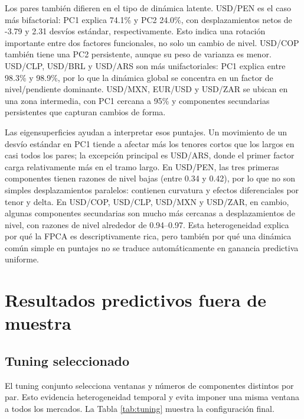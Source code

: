 \documentclass[12pt,a4paper]{article}
\begin{document}
Los pares también difieren en el tipo de dinámica latente. USD/PEN es el caso más bifactorial: PC1 explica 74.1\% y PC2 24.0\%, con desplazamientos netos de -3.79 y 2.31 desvíos estándar, respectivamente. Esto indica una rotación importante entre dos factores funcionales, no solo un cambio de nivel. USD/COP también tiene una PC2 persistente, aunque su peso de varianza es menor. USD/CLP, USD/BRL y USD/ARS son más unifactoriales: PC1 explica entre 98.3\% y 98.9\%, por lo que la dinámica global se concentra en un factor de nivel/pendiente dominante. USD/MXN, EUR/USD y USD/ZAR se ubican en una zona intermedia, con PC1 cercana a 95\% y componentes secundarias persistentes que capturan cambios de forma.

Las eigensuperficies ayudan a interpretar esos puntajes. Un movimiento de un desvío estándar en PC1 tiende a afectar más los tenores cortos que los largos en casi todos los pares; la excepción principal es USD/ARS, donde el primer factor carga relativamente más en el tramo largo. En USD/PEN, las tres primeras componentes tienen razones de nivel bajas (entre 0.34 y 0.42), por lo que no son simples desplazamientos paralelos: contienen curvatura y efectos diferenciales por tenor y delta. En USD/COP, USD/CLP, USD/MXN y USD/ZAR, en cambio, algunas componentes secundarias son mucho más cercanas a desplazamientos de nivel, con razones de nivel alrededor de 0.94--0.97. Esta heterogeneidad explica por qué la FPCA es descriptivamente rica, pero también por qué una dinámica común simple en puntajes no se traduce automáticamente en ganancia predictiva uniforme.

\section{Resultados predictivos fuera de muestra}

\subsection{Tuning seleccionado}

El tuning conjunto selecciona ventanas y números de componentes distintos por par. Esto evidencia heterogeneidad temporal y evita imponer una misma ventana a todos los mercados. La Tabla \ref{tab:tuning} muestra la configuración final.
\end{document}
